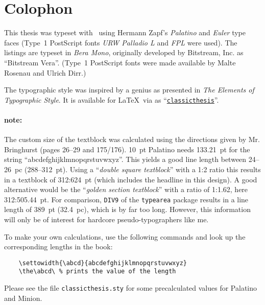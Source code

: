 \pagestyle{empty}

\hfill

\vfill


\section*{Colophon}
This thesis was typeset with \LaTeXe\ using Hermann Zapf's
\emph{Palatino}
and \emph{Euler} type faces (Type~1 PostScript fonts \emph{URW
Palladio L}
and \emph{FPL} were used). The listings are typeset in \emph{Bera
Mono}, originally developed by Bitstream, Inc. as ``Bitstream Vera''.
(Type~1 PostScript fonts were made available by Malte Rosenau and
Ulrich Dirr.)

The typographic style was inspired by a genius as
presented in \emph{The Elements of Typographic Style}. It is available for \LaTeX\ via  as
``\href{http://www.ctan.org/tex-archive/macros/latex/contrib/classicthesis/}%
{\texttt{classicthesis}}''.

\paragraph{note:} The custom size of the textblock was calculated
using the directions given by Mr. Bringhurst (pages 26--29 and
175/176). 10~pt Palatino needs  133.21~pt for the string
``abcdefghijklmnopqrstuvwxyz''. This yields a good line length between
24--26~pc (288--312~pt). Using a ``\emph{double square textblock}''
with a 1:2 ratio this results in a textblock of 312:624~pt (which
includes the headline in this design). A good alternative would be the
``\emph{golden section textblock}'' with a ratio of 1:1.62, here
312:505.44~pt. For comparison, \texttt{DIV9} of the \texttt{typearea}
package results in a line length of 389~pt (32.4~pc), which is by far
too long. However, this information will only be of interest for
hardcore pseudo-typographers like me.%

To make your own calculations, use the following commands and look up
the corresponding lengths in the book:
\begin{verbatim}
    \settowidth{\abcd}{abcdefghijklmnopqrstuvwxyz}
    \the\abcd\ % prints the value of the length
\end{verbatim}
Please see the file \texttt{classicthesis.sty} for some precalculated
values for Palatino and Minion.



\bigskip

\noindent\finalVersionString



